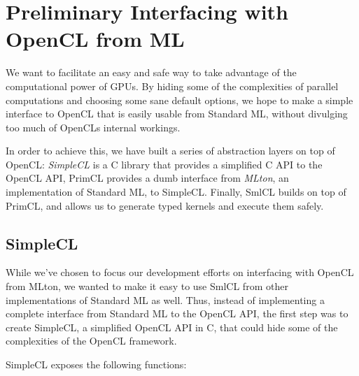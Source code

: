 \section{Preliminary Interfacing with OpenCL from ML}

We want to facilitate an easy and safe way to take advantage of the
computational power of GPUs. By hiding some of the complexities of
parallel computations and choosing some sane default options, we hope
to make a simple interface to OpenCL that is easily usable from
Standard ML, without divulging too much of OpenCLs internal workings.

In order to achieve this, we have built a series of abstraction layers
on top of OpenCL: \emph{SimpleCL} is a C library that provides a
simplified C API to the OpenCL API, PrimCL provides a dumb interface
from \emph{MLton}, an implementation of Standard ML, to
SimpleCL. Finally, SmlCL builds on top of PrimCL, and allows us to
generate typed kernels and execute them safely.

\subsection{SimpleCL}

While we've chosen to focus our development efforts on interfacing
with OpenCL from MLton, we wanted to make it easy to use SmlCL from
other implementations of Standard ML as well. Thus, instead of
implementing a complete interface from Standard ML to the OpenCL API,
the first step was to create SimpleCL, a simplified OpenCL API in C,
that could hide some of the complexities of the OpenCL framework.

SimpleCL exposes the following functions:

